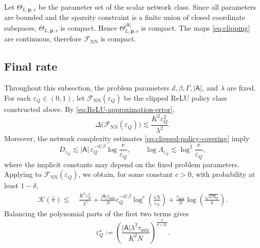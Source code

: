 \documentclass{article}
\theoremstyle{definition}
\theoremstyle{remark}
\theoremstyle{plain}
\numberwithin{equation}{section}
\begin{document}
Let \(\Theta_{L,\mathbf p,s}\) be the parameter set of the scalar
network class. Since all parameters are bounded and the sparsity
constraint is a finite union of closed coordinate subspaces,
\(\Theta_{L,\mathbf p,s}\) is compact. Hence
\(\Theta_{L,\mathbf p,s}^{|\mathsf A|}\) is compact. The maps \eqref{eq:clipping}
are continuous, therefore
\(\mathcal F_{\mathrm{NN}}\) is compact.
\subsection{Final rate}
\label{subsec:relu-final-rate}

Throughout this subsection, the problem parameters
\(d,\beta,\Gamma,|\mathsf A|\), and \(\lambda\) are fixed.
For each \(\varepsilon_Q\in(0,1)\), let
\(\mathcal F_{\mathrm{NN}}(\varepsilon_Q)\) be the clipped ReLU policy
class constructed above. By \eqref{eq:ReLU-approximation-error},
\begin{equation}
\label{eq:relu-Delta-final}
    \Delta\bigl(\mathcal F_{\mathrm{NN}}(\varepsilon_Q)\bigr)
    \lesssim
    \frac{K^2\varepsilon_Q^2}{\lambda^2}.
\end{equation}
Moreover, the network complexity estimates
\eqref{eq:clipped-policy-covering} imply
\[
    D_{\varepsilon_Q}
    \lesssim
    |\mathsf A|\,
    \varepsilon_Q^{-d/\beta}
    \log\frac{e}{\varepsilon_Q},
    \qquad
    \log\Lambda_{\varepsilon_Q}
    \lesssim
    \log^2\frac{e}{\varepsilon_Q},
\]
where the implicit constants may depend on the fixed problem
parameters.
Applying  to
\(\mathcal F_{\mathrm{NN}}(\varepsilon_Q)\), we obtain, for some
constant \(c>0\), with probability at least \(1-\delta\),
\begin{equation}
\label{eq:relu-risk-before-optimization}
\begin{aligned}
    \mathcal K(\widehat\pi)
    \lesssim\;&
    \frac{K^2\varepsilon_Q^2}{\lambda^2}
    +
    \frac{
        |\mathsf A|\tau_{\mathrm{mix}}
    }{N}
    \varepsilon_Q^{-d/\beta}
    \log^c\left(
        \frac{eN}{\varepsilon_Q}
    \right)
    +
    \frac{\tau_{\mathrm{mix}}}{N}
    \log\left(
        \frac{\sqrt{2\mathfrak N_0}}{\delta}
    \right).
\end{aligned}
\end{equation}
Balancing the polynomial parts of the first two terms gives
\begin{equation}
\label{eq:relu-optimal-epsilon}
    \varepsilon_Q^\star
    :=
    \left(
        \frac{
            |\mathsf A|\lambda^2\tau_{\mathrm{mix}}
        }{
            K^2N
        }
    \right)^{\frac{\beta}{d+2\beta}}.
\end{equation}
\end{document}
